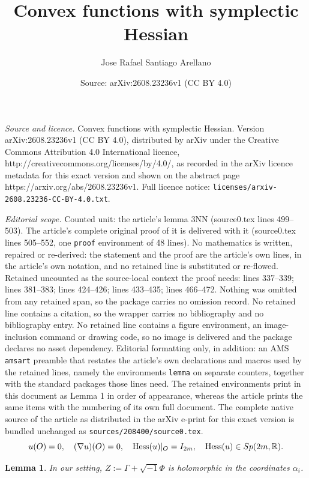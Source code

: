 \documentclass[10pt,a4paper]{amsart}
\title{Convex functions with symplectic Hessian}
\author{Jose Rafael Santiago Arellano}
\date{Source: arXiv:2608.23236v1 (CC BY 4.0)}
\newtheorem{lemma}{Lemma}
\newcommand{\R}{\mathbb{R}}
\begin{document}
\maketitle

\noindent\emph{Source and licence.} Convex functions with symplectic Hessian. Version arXiv:2608.23236v1 (CC BY 4.0), distributed by arXiv under the Creative Commons Attribution 4.0 International licence, http://creativecommons.org/licenses/by/4.0/, as recorded in the arXiv licence metadata for this exact version and shown on the abstract page https://arxiv.org/abs/2608.23236v1. Full licence notice: \texttt{licenses/arxiv-2608.23236-CC-BY-4.0.txt}.\par\smallskip

\noindent\textit{Editorial scope.} Counted unit: the article's lemma 3NN (source0.tex lines 499--503). The article's complete original proof of it is delivered with it (source0.tex lines 505--552, one \texttt{proof} environment of 48 lines). No mathematics is written, repaired or re-derived: the statement and the proof are the article's own lines, in the article's own notation, and no retained line is substituted or re-flowed.  Retained uncounted as the source-local context the proof needs: lines 337--339; lines 381--383; lines 424--426; lines 433--435; lines 466--472.  Nothing was omitted from any retained span, so the package carries no omission record.  No retained line contains a citation, so the wrapper carries no bibliography and no bibliography entry.  No retained line contains a figure environment, an image-inclusion command or drawing code, so no image is delivered and the package declares no asset dependency.  Editorial formatting only, in addition: an AMS \texttt{amsart} preamble that restates the article's own declarations and macros used by the retained lines, namely the environments \texttt{lemma} on separate counters, together with the standard packages those lines need.  The retained environments print in this document as Lemma 1 in order of appearance, whereas the article prints the same items with the numbering of its own full document.  The complete native source of the article as distributed in the arXiv e-print for this exact version is bundled unchanged as \texttt{sources/208400/source0.tex}.
\begin{equation}\label{symplectic}
u(O)=0, \quad (\nabla u)(O)=0, \quad  \operatorname{Hess}(u)|_{O}=I_{2m}, \quad \operatorname{Hess}(u)\in{\rm Sp}(2m,\R).
\end{equation}

\begin{lemma}\label{Zholo}
    In our setting, $Z := \Gamma+\sqrt{-1}\Phi$ is holomorphic in the coordinates $\alpha_i$.
\end{lemma}
\end{document}
